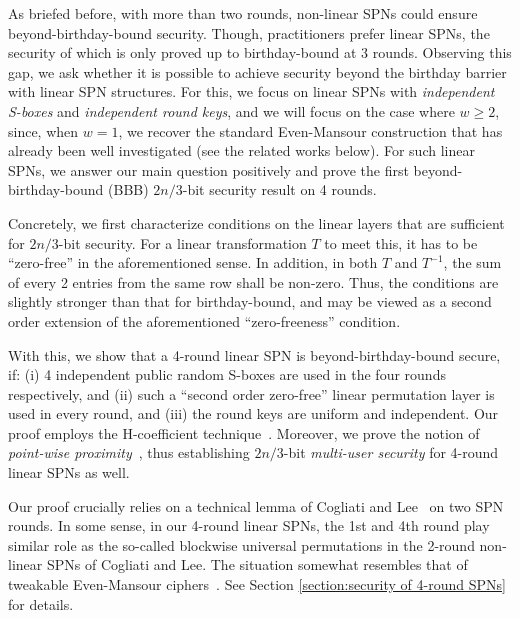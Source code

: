 As briefed before, with more than two rounds, non-linear SPNs could ensure beyond-birthday-bound security. Though, practitioners prefer linear SPNs, the security of which is only proved up to birthday-bound at 3 rounds.
%
%
%
Observing this gap, we ask whether it is possible to achieve security beyond the birthday barrier with linear SPN structures. For this, we focus on linear SPNs with {\it independent S-boxes} and {\it independent round keys}, and we will focus on the case where $w\geq2$, since, when $w = 1$, we recover the standard Even-Mansour construction that has already been well investigated (see the related works below). For such linear SPNs, we answer our main question positively and prove the first beyond-birthday-bound (BBB) $2n/3$-bit security result on 4 rounds.


Concretely, we first characterize conditions on the linear layers that are sufficient for $2n/3$-bit security. For a linear transformation $T$ to meet this, it has to be ``zero-free'' in the aforementioned sense. In addition, in both $T$ and $T^{-1}$, the sum of every 2 entries from the same row shall be non-zero. Thus, the conditions are slightly stronger than that for birthday-bound, and may be viewed as a second order extension of the aforementioned ``zero-freeness'' condition.
%
%

With this, we show that a 4-round linear SPN is beyond-birthday-bound secure, if: (i) 4 independent public random S-boxes are used in the four rounds respectively, and (ii) such a ``second order zero-free'' linear permutation layer is used in every round, and (iii) the round keys are uniform and independent. Our proof employs the H-coefficient technique~\cite{SAC:Patarin08}. Moreover, we prove the notion of {\it point-wise proximity}~\cite{C:HoaTes16}, thus establishing $2n/3$-bit {\it multi-user security} for 4-round linear SPNs as well.


Our proof crucially relies on a technical lemma of Cogliati and Lee~\cite{EPRINT:CogLee18} on two SPN rounds. In some sense, in our 4-round linear SPNs, the 1st and 4th round play similar role as the so-called blockwise universal permutations in the 2-round non-linear SPNs of Cogliati and Lee. The situation somewhat resembles that of tweakable Even-Mansour ciphers~\cite{C:CogLamSeu15,AC:CogSeu15}. See Section \ref{section:security of 4-round SPNs} for details.




